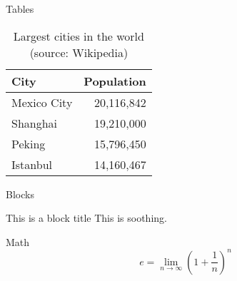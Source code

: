 \documentclass[10pt, compress]{beamer}
\begin{document}
\begin{frame}{Tables}
  \begin{table}
    \caption{Largest cities in the world (source: Wikipedia)}
    \begin{tabular}{lr}
      \toprule
      City & Population\\
      \midrule
      Mexico City & 20,116,842\\
      Shanghai & 19,210,000\\
      Peking & 15,796,450\\
      Istanbul & 14,160,467\\
      \bottomrule
    \end{tabular}
  \end{table}
\end{frame}
\begin{frame}{Blocks}

  \begin{block}{This is a block title}
    This is soothing.
  \end{block}

\end{frame}
\begin{frame}{Math}
  \begin{equation*}
    e = \lim_{n\to \infty} \left(1 + \frac{1}{n}\right)^n
  \end{equation*}
\end{frame}





\end{document}
